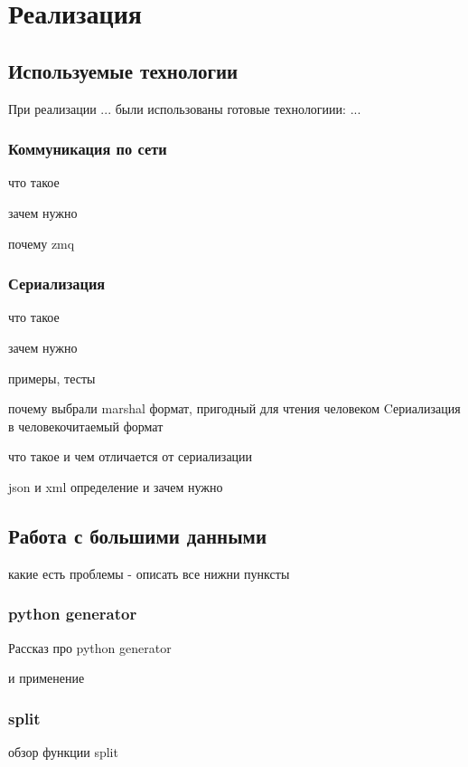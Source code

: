 \documentclass[12pt,a4paper,oneside]{extarticle}
\begin{document}
\section{Реализация}
    \subsection{Используемые технологии}
        При реализации ... были использованы готовые технологиии: ...

        \subsubsection{Коммуникация по сети}
            что такое

            зачем нужно

            почему zmq

        \subsubsection{Сериализация}
            что такое

            зачем нужно

            примеры, тесты

            почему выбрали marshal
            формат, пригодный для чтения человеком
            Cериализация в человекочитаемый формат %

            что такое и чем отличается от сериализации

            json и xml определение и зачем нужно

    \clearpage

    \subsection{Работа с большими данными}

        какие есть проблемы - описать все нижни пунксты

        \subsubsection{python generator}
            Рассказ про python generator

            и применение

        \subsubsection{split}
            обзор функции split
\end{document}
